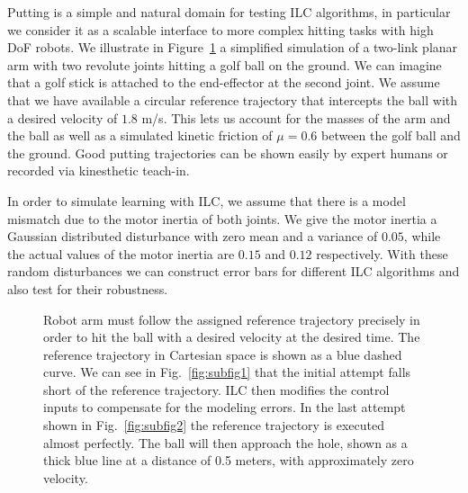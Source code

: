 Putting is a simple and natural domain for testing ILC algorithms, in particular we consider it as a scalable interface to more complex hitting tasks with high DoF robots. We illustrate in Figure~\ref{putting1} a simplified simulation of a two-link planar arm with two revolute joints hitting a golf ball on the ground. We can imagine that a golf stick is attached to the end-effector at the second joint. We assume that we have available a circular reference trajectory that intercepts the ball with a desired velocity of $1.8$ m/s. This lets us account for the masses of the arm and the ball as well as a simulated kinetic friction of $\mu = 0.6$ between the golf ball and the ground. Good putting trajectories can be shown easily by expert humans or recorded via kinesthetic teach-in. 

In order to simulate learning with ILC, we assume that there is a model mismatch due to the motor inertia of both joints. We give the motor inertia a Gaussian distributed disturbance with zero mean and a variance of $0.05$, while the actual values of the motor inertia are $0.15$ and $0.12$ respectively. With these random disturbances we can construct error bars for different ILC algorithms and also test for their robustness.

\begin{figure}[ht]
\centering
{}
\caption{Robot arm must follow the assigned reference trajectory precisely in order to hit the ball with a desired velocity at the desired time. The reference trajectory in Cartesian space is shown as a blue dashed curve. We can see in Fig.~\ref{fig:subfig1} that the initial attempt falls short of the reference trajectory. ILC then modifies the control inputs to compensate for the modeling errors. In the last attempt shown in Fig.~\ref{fig:subfig2} the reference trajectory is executed almost perfectly. The ball will then approach the hole, shown as a thick blue line at a distance of 0.5 meters, with approximately zero velocity.} 
\label{putting1} 
\end{figure}

